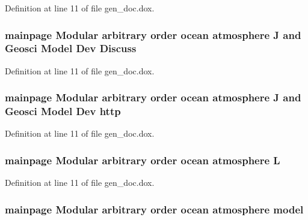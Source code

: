 Definition at line 11 of file gen\-\_\-doc.\-dox.

\hypertarget{gen__doc_8dox_ac36dc9198b702d0d482aefdc388d1cee}{
\subsubsection[{Discuss}]{\setlength{\rightskip}{0pt plus 5cm}mainpage Modular arbitrary order ocean atmosphere J and Geosci Model Dev Discuss}}\label{gen__doc_8dox_ac36dc9198b702d0d482aefdc388d1cee}


Definition at line 11 of file gen\-\_\-doc.\-dox.

\hypertarget{gen__doc_8dox_a5a04d589377871736f2225deb4a3287f}{
\subsubsection[{http}]{\setlength{\rightskip}{0pt plus 5cm}mainpage Modular arbitrary order ocean atmosphere J and Geosci Model Dev http}}\label{gen__doc_8dox_a5a04d589377871736f2225deb4a3287f}


Definition at line 11 of file gen\-\_\-doc.\-dox.

\hypertarget{gen__doc_8dox_ad4624cc5079269009eae5ce9767cadce}{
\subsubsection[{L}]{\setlength{\rightskip}{0pt plus 5cm}mainpage Modular arbitrary order ocean atmosphere L}}\label{gen__doc_8dox_ad4624cc5079269009eae5ce9767cadce}


Definition at line 11 of file gen\-\_\-doc.\-dox.

\hypertarget{gen__doc_8dox_a3c7b45657e3d2c921eb484207480cab6}{
\subsubsection[{model}]{\setlength{\rightskip}{0pt plus 5cm}mainpage Modular arbitrary order ocean atmosphere model}}\label{gen__doc_8dox_a3c7b45657e3d2c921eb484207480cab6}


